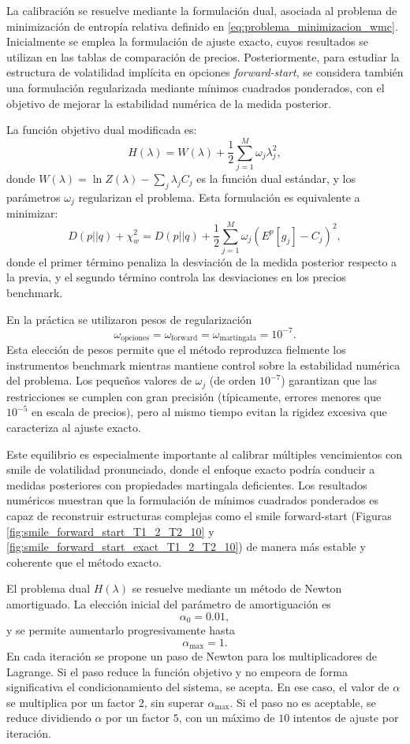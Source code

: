 La calibración se resuelve mediante la formulación dual, asociada al problema de minimización de entropía relativa definido en \ref{eq:problema_minimizacion_wmc}. Inicialmente se emplea la formulación de ajuste exacto, cuyos resultados se utilizan en las tablas de comparación de precios. Posteriormente, para estudiar la estructura de volatilidad implícita en opciones \textit{forward-start}, se considera también una formulación regularizada mediante mínimos cuadrados ponderados, con el objetivo de mejorar la estabilidad numérica de la medida posterior.\medskip

La función objetivo dual modificada es:
\[
H(\lambda) = W(\lambda) + \frac{1}{2}\sum_{j=1}^{M}\omega_j\lambda_j^2,
\]
donde \(W(\lambda) = \ln Z(\lambda) - \sum_j \lambda_j C_j\) es la función dual estándar, y los parámetros \(\omega_j\) regularizan el problema. Esta formulación es equivalente a minimizar:
\[
D(p||q) + \chi^2_w = D(p||q) + \frac{1}{2}\sum_{j=1}^{M}\omega_j\left(E^p[g_j] - C_j\right)^2,
\]
donde el primer término penaliza la desviación de la medida posterior respecto a la previa, y el segundo término controla las desviaciones en los precios benchmark.

En la práctica se utilizaron pesos de regularización
\[
\omega_{\mathrm{opciones}}
=
\omega_{\mathrm{forward}}
=
\omega_{\mathrm{martingala}}
=
10^{-7}.
\]
Esta elección de pesos permite que el método reproduzca fielmente los instrumentos benchmark mientras mantiene control sobre la estabilidad numérica del problema. Los pequeños valores de \(\omega_j\) (de orden \(10^{-7}\)) garantizan que las restricciones se cumplen con gran precisión (típicamente, errores menores que \(10^{-5}\) en escala de precios), pero al mismo tiempo evitan la rigidez excesiva que caracteriza al ajuste exacto.\medskip

Este equilibrio es especialmente importante al calibrar múltiples vencimientos con smile de volatilidad pronunciado, donde el enfoque exacto podría conducir a medidas posteriores con propiedades martingala deficientes. Los resultados numéricos muestran que la formulación de mínimos cuadrados ponderados es capaz de reconstruir estructuras complejas como el smile forward-start (Figuras \ref{fig:smile_forward_start_T1_2_T2_10} y \ref{fig:smile_forward_start_exact_T1_2_T2_10}) de manera más estable y coherente que el método exacto.\medskip

El problema dual \(H(\lambda)\) se resuelve mediante un método de Newton amortiguado. La elección inicial del parámetro de amortiguación es
\[
\alpha_0=0.01,
\]
y se permite aumentarlo progresivamente hasta
\[
\alpha_{\max}=1.
\]
En cada iteración se propone un paso de Newton para los multiplicadores de Lagrange. Si el paso reduce la función objetivo y no empeora de forma significativa el condicionamiento del sistema, se acepta. En ese caso, el valor de \(\alpha\) se multiplica por un factor \(2\), sin superar \(\alpha_{\max}\). Si el paso no es aceptable, se reduce dividiendo \(\alpha\) por un factor \(5\), con un máximo de \(10\) intentos de ajuste por iteración.\medskip

